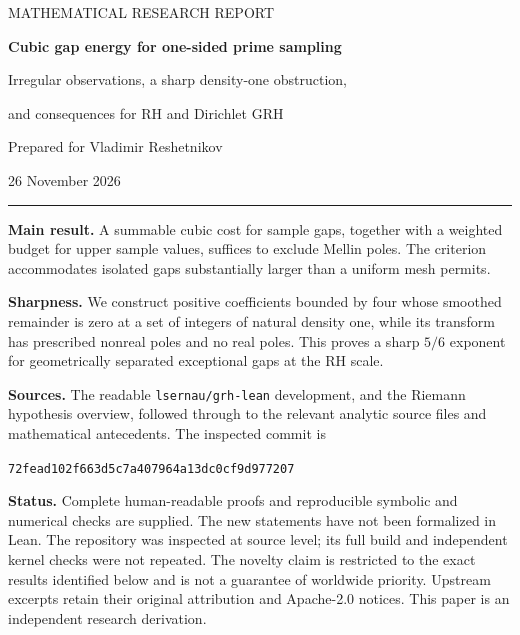 \documentclass[11pt,a4paper]{article}
\theoremstyle{definition}
\theoremstyle{remark}
\numberwithin{equation}{section}
\begin{document}
\hypersetup{pageanchor=false}
\begin{titlepage}
\vspace*{10mm}
{\color{MidnightBlue}\large MATHEMATICAL RESEARCH REPORT\par}
\vspace{9mm}
{\Huge\bfseries Cubic gap energy for one-sided prime sampling\par}
\vspace{7mm}
{\Large Irregular observations, a sharp density-one obstruction,\par
and consequences for RH and Dirichlet GRH\par}
\vspace{12mm}
{\large Prepared for Vladimir Reshetnikov\par}
{\large 26 November 2026\par}
\vspace{10mm}
\hrule
\vspace{6mm}
\textbf{Main result.} A summable cubic cost for sample gaps, together
with a weighted budget for upper sample values, suffices to exclude
Mellin poles. The criterion accommodates isolated gaps substantially
larger than a uniform mesh permits.

\textbf{Sharpness.} We construct positive coefficients bounded by four
whose smoothed remainder is zero at a set of integers of natural
density one, while its transform has prescribed nonreal poles and no
real poles. This proves a sharp \(5/6\) exponent for geometrically
separated exceptional gaps at the RH scale.

\textbf{Sources.} The readable \texttt{lsernau/grh-lean} development,
and the Riemann hypothesis overview, followed through to the relevant
analytic source files and mathematical antecedents. The inspected commit is
\begin{center}\small\texttt{72fead102f663d5c7a407964a13dc0cf9d977207}\end{center}

\textbf{Status.} Complete human-readable proofs and reproducible
symbolic and numerical checks are supplied. The new statements have
not been formalized in Lean. The repository was inspected at source
level; its full build and independent kernel checks were not repeated.
The novelty claim is restricted to the exact results identified below
and is not a guarantee of worldwide priority.
\vfill
{\small Upstream excerpts retain their original attribution and
Apache-2.0 notices. This paper is an independent research derivation.}
\end{titlepage}
\hypersetup{pageanchor=true}
\end{document}
